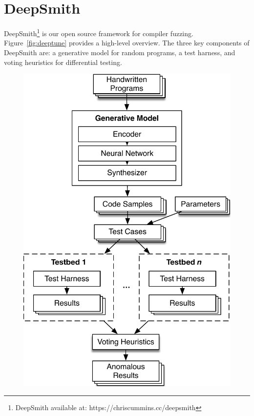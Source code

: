 \section{DeepSmith}

DeepSmith\footnote{DeepSmith available at: https://chriscummins.cc/deepsmith} is our open source framework for compiler fuzzing. Figure~\ref{fig:deeptune} provides a high-level overview. The three key components of DeepSmith are: a generative model for random programs, a test harness, and voting heuristics for differential testing.

\begin{figure}[t!]
	\centering
	\begin{minipage}{.5\textwidth}
		\centering
		\vspace{-2em}
		\includegraphics[width=.95\linewidth]{img/deepsmith}

\end{minipage}
\end{figure}
